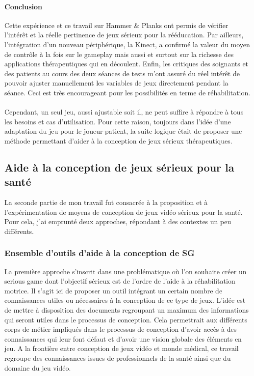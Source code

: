 \documentclass[french, 12pt]{article} %
\begin{document}
\paragraph{Conclusion\\}
Cette expérience et ce travail sur Hammer \& Planks ont permis de vérifier l'intérêt et la réelle pertinence de jeux sérieux pour la rééducation. Par ailleurs, l'intégration d'un nouveau périphérique, la Kinect, a confirmé la valeur du moyen de contrôle à la fois sur le gameplay mais aussi et surtout sur la richesse des applications thérapeutiques qui en découlent. Enfin, les critiques des soignants et des patients au cours des deux séances de tests m'ont assuré du réel intérêt de pouvoir ajuster manuellement les variables de jeux directement pendant la séance. Ceci est très encourageant pour les possibilités en terme de réhabilitation.

\paragraph{}
Cependant, un seul jeu, aussi ajustable soit il, ne peut suffire à répondre à tous les besoins et cas d'utilisation. Pour cette raison, toujours dans l'idée d'une adaptation du jeu pour le joueur-patient, la suite logique était de proposer une méthode permettant d'aider à la conception de jeux sérieux thérapeutiques.

\subsection{Aide à la conception de jeux sérieux pour la santé}
La seconde partie de mon travail fut consacrée à la proposition et à l'expérimentation de moyens de conception de jeux vidéo sérieux pour la santé. Pour cela, j'ai emprunté deux approches, répondant à des contextes un peu différents.

	\subsubsection{Ensemble d'outils d'aide à la conception de SG}
La première approche s'inscrit dans une problématique où l'on souhaite créer un serious game dont l'objectif sérieux est de l'ordre de l'aide à la réhabilitation motrice. Il s'agit ici de proposer un outil intégrant un certain nombre de connaissances utiles ou nécessaires à la conception de ce type de jeux. L'idée est de mettre à disposition des documents regroupant un maximum des informations qui seront utiles dans le processus de conception. Cela permettrait aux différents corps de métier impliqués dans le processus de conception d'avoir accès à des connaissances qui leur font défaut et d'avoir une vision globale des éléments en jeu. A la frontière entre conception de jeux vidéo et monde médical, ce travail regroupe des connaissances issues de professionnels de la santé ainsi que du domaine du jeu vidéo.
\end{document}
